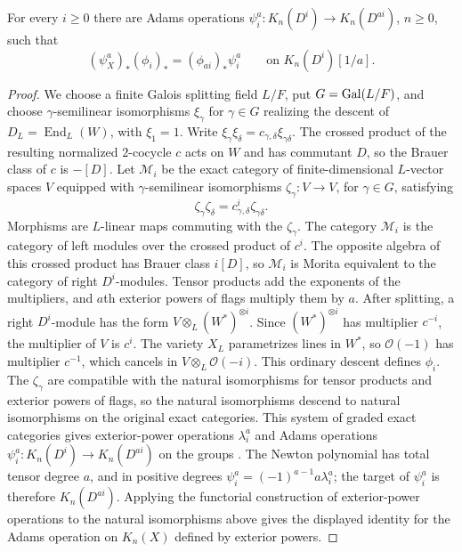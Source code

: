 \begin{lemma}\label{lem:paper-brauer-power-descent}
For every $i\ge0$ there are Adams operations $\psi_i^a\colon K_n(D^i)\to K_n(D^{ai})$, $n\ge0$, such that
\[
 (\psi_X^a)_*(\phi_i)_*=(\phi_{ai})_*\psi_i^a\qquad\text{on }K_n(D^i)[1/a].
\]
\end{lemma}
\begin{proof}
We choose a finite Galois splitting field $L/F$, put $G=\operatorname{Gal}(L/F)$, and choose $\gamma$-semilinear isomorphisms $\xi_\gamma$ for $\gamma\in G$ realizing the descent of $D_L=\operatorname{End}_L(W)$, with $\xi_1=1$.
Write $\xi_\gamma\xi_\delta=c_{\gamma,\delta}\xi_{\gamma\delta}$.
The crossed product of the resulting normalized $2$-cocycle $c$ acts on $W$ and has commutant $D$, so the Brauer class of $c$ is $-[D]$.
Let $\mathcal M_i$ be the exact category of finite-dimensional $L$-vector spaces $V$ equipped with $\gamma$-semilinear isomorphisms $\zeta_\gamma:V\to V$, for $\gamma\in G$, satisfying
\[
                     \zeta_\gamma\zeta_\delta=c_{\gamma,\delta}^{i}\zeta_{\gamma\delta}.
\]
Morphisms are $L$-linear maps commuting with the $\zeta_\gamma$.
The category $\mathcal M_i$ is the category of left modules over the crossed product of $c^i$.
The opposite algebra of this crossed product has Brauer class $i[D]$, so $\mathcal M_i$ is Morita equivalent to the category of right $D^i$-modules.
Tensor products add the exponents of the multipliers, and $a$th exterior powers of flags multiply them by $a$.
After splitting, a right $D^i$-module has the form $V\otimes_L(W^*)^{\otimes i}$.
Since $(W^*)^{\otimes i}$ has multiplier $c^{-i}$, the multiplier of $V$ is $c^i$.
The variety $X_L$ parametrizes lines in $W^*$, so $\mathcal O(-1)$ has multiplier $c^{-1}$, which cancels in $V\otimes_L\mathcal O(-i)$.
This ordinary descent defines $\phi_i$.
The $\zeta_\gamma$ are compatible with the natural isomorphisms for tensor products and exterior powers of flags, so the natural isomorphisms descend to natural isomorphisms on the original exact categories.
This system of graded exact categories gives exterior-power operations $\lambda_i^a$ and Adams operations $\psi_i^a:K_n(D^i)\to K_n(D^{ai})$ on the groups \cite[Definition 1.1, Definition 2.1, Proposition 2.2, (2.8), Theorem 4.1]{KockZanchettaPower}.
The Newton polynomial has total tensor degree $a$, and in positive degrees $\psi_i^a=(-1)^{a-1}a\lambda_i^a$; the target of $\psi_i^a$ is therefore $K_n(D^{ai})$.
Applying the functorial construction of exterior-power operations to the natural isomorphisms above gives the displayed identity for the Adams operation on $K_n(X)$ defined by exterior powers.


\end{proof}
